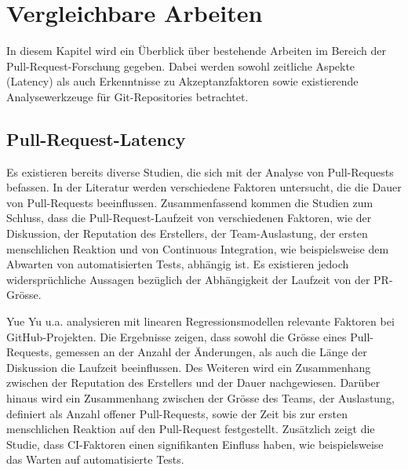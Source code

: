 \section{Vergleichbare Arbeiten}
In diesem Kapitel wird ein Überblick über bestehende Arbeiten im Bereich der Pull-Request-Forschung gegeben. Dabei werden sowohl zeitliche Aspekte (Latency) als auch Erkenntnisse zu Akzeptanzfaktoren sowie existierende Analysewerkzeuge für Git-Repositories betrachtet.

\subsection{Pull-Request-Latency}
\label{sec:PullRequestDauer}
Es existieren bereits diverse Studien, die sich mit der Analyse von Pull-Requests befassen. In der Literatur werden verschiedene Faktoren untersucht, die die Dauer von Pull-Requests beeinflussen. Zusammenfassend kommen die Studien zum Schluss, dass die Pull-Request-Laufzeit von verschiedenen Faktoren, wie der Diskussion, der Reputation des Erstellers, der Team-Auslastung, der ersten menschlichen Reaktion und von Continuous Integration, wie beispielsweise dem Abwarten von automatisierten Tests, abhängig ist. Es existieren jedoch widersprüchliche Aussagen bezüglich der Abhängigkeit der Laufzeit von der PR-Grösse. \parencite{yu_wait_2015}\parencite{hasan_understanding_2023}\parencite{kudrjavets_small_2022}\parencite{bernardo_studying_2018}

Yue Yu u.a.\parencite{yu_wait_2015} analysieren mit linearen Regressionsmodellen relevante Faktoren bei GitHub-Projekten. Die Ergebnisse zeigen, dass sowohl die Grösse eines Pull-Requests, gemessen an der Anzahl der Änderungen, als auch die Länge der Diskussion die Laufzeit beeinflussen. Des Weiteren wird ein Zusammenhang zwischen der Reputation des Erstellers und der Dauer nachgewiesen. Darüber hinaus wird ein Zusammenhang zwischen der Grösse des Teams, der Auslastung, definiert als Anzahl offener Pull-Requests, sowie der Zeit bis zur ersten menschlichen Reaktion auf den Pull-Request festgestellt. Zusätzlich zeigt die Studie, dass CI-Faktoren einen signifikanten Einfluss haben, wie beispielsweise das Warten auf automatisierte Tests.~\parencite{yu_wait_2015}

